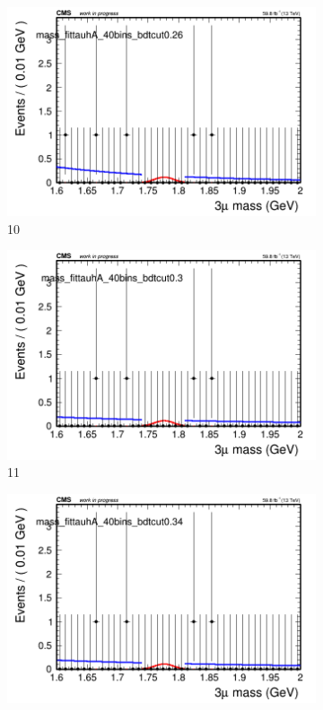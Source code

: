 \begin{figure}[h!]
\begin{subfigure}{0.2\textwidth}
        \includegraphics[width=\textwidth]{power_law/plots/tauhA/massfit_tauhA_40bins_bdtcut0.26.png}
        \caption{10}
    \end{subfigure}
    \begin{subfigure}{0.2\textwidth}
        \includegraphics[width=\textwidth]{power_law/plots/tauhA/massfit_tauhA_40bins_bdtcut0.3.png}
        \caption{11}
    \end{subfigure}
    \begin{subfigure}{0.2\textwidth}
        \includegraphics[width=\textwidth]{power_law/plots/tauhA/massfit_tauhA_40bins_bdtcut0.34.png}

\end{subfigure}
\end{figure}
